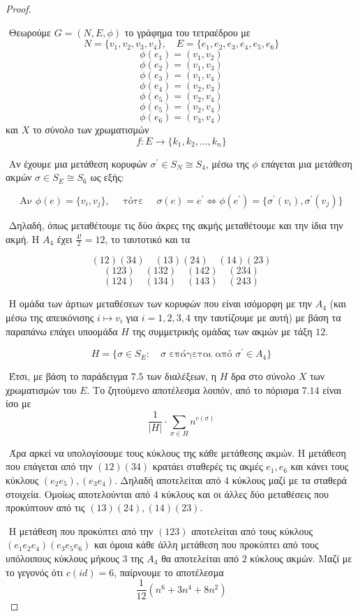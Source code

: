 \documentclass[oneside,a4paper]{article}
\begin{document}
\vspace*{1cm}
\begin{proof} $ $

	$ $\newline
	Θεωρούμε $G=(N,E,\phi)$ το γράφημα του τετραέδρου με $$N = \{v_1,v_2,v_3,v_4\}, \quad E = \{e_1,e_2,e_3,e_4,e_5,e_6\}$$ $$\phi(e_1) = (v_1,v_2)$$ $$\phi(e_2) = (v_1,v_3)$$ $$\phi(e_3) = (v_1,v_4)$$ $$\phi(e_4) = (v_2,v_3)$$ $$\phi(e_5) = (v_2,v_4)$$ $$\phi(e_5) = (v_2,v_4)$$ $$\phi(e_6) = (v_3,v_4)$$ και $X$ το σύνολο των χρωματισμών 
	$$f:E \longrightarrow \{k_1,k_2,\ldots,k_n\}$$

	$ $\newline
	Αν έχουμε μια μετάθεση κορυφών $\sigma^{\prime} \in S_N \cong S_4$, μέσω της $\phi$ επάγεται μια μετάθεση ακμών $\sigma \in S_E \cong S_6$ ως εξής:

	$$\text{Αν } \phi(e) = \{v_i,v_j\}, \quad\text{ τότε } \quad \sigma(e) = e^{\prime} \iff \phi(e^{\prime}) = \{\sigma^{\prime}(v_i),\sigma^{\prime} (v_j)\}  $$

	$ $\newline
	Δηλαδή, όπως μεταθέτουμε τις δύο άκρες της ακμής μεταθέτουμε και την ίδια την ακμή. Η $A_4$ έχει $\frac{4!}2 = 12$, το ταυτοτικό και τα 
	
	$$(12)(34) \quad (13)(24) \quad (14)(23)$$
	$$(123) \quad (132) \quad (142) \quad (234)$$
	$$(124) \quad (134) \quad (143) \quad (243)$$
	
	$ $\newline
	Η ομάδα των άρτιων μεταθέσεων των κορυφών που είναι ισόμορφη με την $A_4$ (και μέσω της απεικόνισης $i\mapsto v_i$ για  $i=1,2,3,4$ την ταυτίζουμε με αυτή) με βάση τα παραπάνω επάγει υποομάδα $H$ της συμμετρικής ομάδας των ακμών με τάξη $12$.

	$$H = \{\sigma \in S_E: \quad \sigma \text{ επάγεται από } \sigma^{\prime} \in A_4\}$$

	$ $\newline
	Έτσι, με βάση το παράδειγμα $7.5$ των διαλέξεων, η $H$ δρα στο σύνολο $X$ των χρωματισμών του $E$. Το ζητούμενο αποτέλεσμα λοιπόν, από το πόρισμα $7.14$ είναι ίσο με
	$$\frac{1}{|H|} \cdot \sum\limits_{\sigma \in H} n^{c(\sigma)}$$

	$ $\newline
	Άρα αρκεί να υπολογίσουμε τους κύκλους της κάθε μετάθεσης ακμών. Η μετάθεση που επάγεται από την $(12)(34)$ κρατάει σταθερές τις ακμές $e_1,e_6$ και κάνει τους κύκλους $(e_2 e_5),(e_3 e_4)$. Δηλαδή αποτελείται από $4$ κύκλους μαζί με τα σταθερά στοιχεία. Ομοίως αποτελούνται από $4$ κύκλους και οι άλλες δύο μεταθέσεις που προκύπτουν από τις $(13)(24),(14)(23)$.

	$ $\newline
	Η μετάθεση που προκύπτει από την $(123)$ αποτελείται από τους κύκλους $(e_1 e_2 e_4)(e_3 e_5 e_6)$ και όμοια κάθε άλλη μετάθεση που προκύπτει από τους υπόλοιπους κύκλους μήκους $3$ της $A_4$ θα αποτελείται από $2$ κύκλους ακμών. Μαζί με το γεγονός ότι $c(id) = 6$, παίρνουμε το αποτέλεσμα
	$$\frac{1}{12}\left(n^6 + 3n^4 + 8n^2\right)$$

\end{proof}
\end{document}

